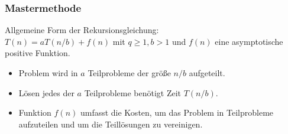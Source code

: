 		\subsubsection{Mastermethode}
			Allgemeine Form der Rekursionsgleichung: \\
			\noindent $T(n) = aT(n/b) + f(n)$ mit $q \geq 1, b > 1$ und $f(n)$ eine asymptotische positive Funktion.

			\begin{itemize}
				\item Problem wird in $a$ Teilprobleme der grö\ss e $n/b$ aufgeteilt.
				\item Lösen jedes der $a$ Teilprobleme benötigt Zeit $T(n/b)$.
				\item Funktion $f(n)$ umfasst die Kosten, um das Problem in Teilprobleme aufzuteilen
					und um die Teillösungen zu vereinigen.
			\end{itemize}


